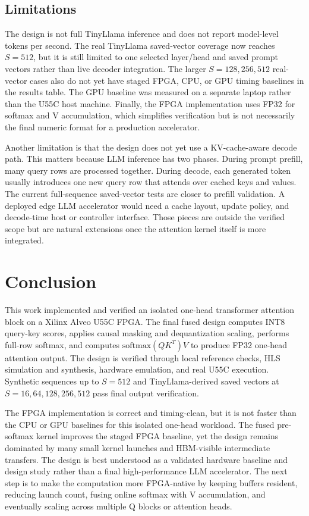 \documentclass[conference]{IMSTemplate}
\begin{document}
\subsection{Limitations}

The design is not full TinyLlama inference and does not report model-level
tokens per second. The
real TinyLlama saved-vector coverage now reaches \(S=512\), but it is still
limited to one selected layer/head and saved prompt vectors rather than live
decoder integration. The larger \(S=128,256,512\) real-vector cases also do not
yet have staged FPGA, CPU, or GPU timing baselines in the results table. The GPU
baseline was measured on a separate laptop rather than the U55C host machine.
Finally, the FPGA implementation uses FP32 for softmax and V accumulation,
which simplifies verification but is not necessarily the final numeric format
for a production accelerator.

Another limitation is that the design does not yet use a KV-cache-aware decode
path. This matters because LLM inference has two phases. During prompt prefill,
many query rows are processed together. During decode, each generated token
usually introduces one new query row that attends over cached keys and values.
The current full-sequence saved-vector tests are closer to prefill validation.
A deployed edge LLM accelerator would need a cache layout, update policy, and
decode-time host or controller interface. Those pieces are outside the verified
scope but are natural extensions once the attention kernel itself is more
integrated.

\section{Conclusion}

This work implemented and verified an isolated one-head transformer attention
block on a Xilinx Alveo U55C FPGA. The final fused design computes
INT8 query-key scores, applies causal masking and dequantization scaling,
performs full-row softmax, and computes \(\mathrm{softmax}(QK^T)V\) to produce
FP32 one-head attention output. The design is verified through local reference
checks, HLS simulation and synthesis, hardware emulation, and real U55C
execution. Synthetic sequences up to \(S=512\) and TinyLlama-derived saved
vectors at \(S=16,64,128,256,512\) pass final output verification.

The FPGA implementation is correct and timing-clean, but it is not faster than
the CPU or GPU baselines for this isolated one-head workload. The fused pre-softmax kernel improves the
staged FPGA baseline, yet the design remains dominated by many small kernel
launches and HBM-visible intermediate transfers. The design is best understood as a validated hardware baseline and design
study rather than a final high-performance LLM accelerator. The next step is to make the computation more
FPGA-native by keeping buffers resident, reducing launch count, fusing online
softmax with V accumulation, and eventually scaling across multiple Q blocks or
attention heads.
\end{document}
